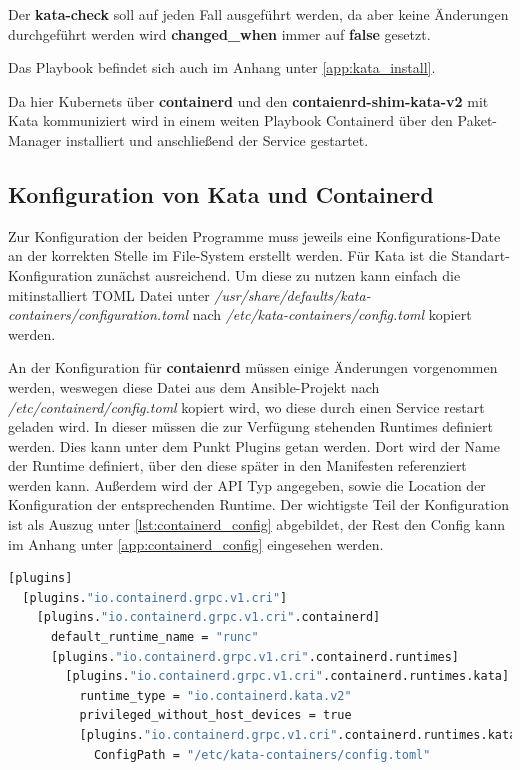 Der \textbf{kata-check} soll auf jeden Fall ausgeführt werden, da aber keine Änderungen durchgeführt werden wird \textbf{changed\_when} immer auf \textbf{false} gesetzt.

Das Playbook befindet sich auch im Anhang unter \ref{app:kata_install}.

Da hier Kubernets über \textbf{containerd} und den \textbf{contaienrd-shim-kata-v2} mit Kata kommuniziert wird in einem weiten Playbook Containerd über den Paket-Manager installiert und anschließend der Service gestartet.


\subsection{Konfiguration von Kata und Containerd}

Zur Konfiguration der beiden Programme muss jeweils eine Konfigurations-Date an der korrekten Stelle im File-System erstellt werden.
Für Kata ist die Standart-Konfiguration zunächst ausreichend. 
Um diese zu nutzen kann einfach die mitinstalliert \ac{TOML} Datei unter \textit{/usr/share/defaults/kata-containers/configuration.toml} nach \textit{/etc/kata-containers/config.toml} kopiert werden.

An der Konfiguration für \textbf{contaienrd} müssen einige Änderungen vorgenommen werden, weswegen diese Datei aus dem Ansible-Projekt nach \textit{/etc/containerd/config.toml} kopiert wird, wo diese durch einen Service restart geladen wird.
In dieser müssen die zur Verfügung stehenden Runtimes definiert werden.
Dies kann unter dem Punkt Plugins getan werden.
Dort wird der Name der Runtime definiert, über den diese später in den Manifesten referenziert werden kann.
Außerdem wird der \ac{API} Typ angegeben, sowie die Location der Konfiguration der entsprechenden Runtime.
Der wichtigste Teil der Konfiguration ist als Auszug unter \ref{lst:containerd_config} abgebildet, der Rest den Config kann im Anhang unter \ref{app:containerd_config} eingesehen werden.

\begin{lstlisting}[language=bash, caption={/etc/contaienrd/config.toml}, label={lst:containerd_config}]
[plugins]
  [plugins."io.containerd.grpc.v1.cri"]
    [plugins."io.containerd.grpc.v1.cri".containerd]
      default_runtime_name = "runc"
      [plugins."io.containerd.grpc.v1.cri".containerd.runtimes]
        [plugins."io.containerd.grpc.v1.cri".containerd.runtimes.kata]
          runtime_type = "io.containerd.kata.v2"
          privileged_without_host_devices = true
          [plugins."io.containerd.grpc.v1.cri".containerd.runtimes.kata.options]
            ConfigPath = "/etc/kata-containers/config.toml"
\end{lstlisting}

